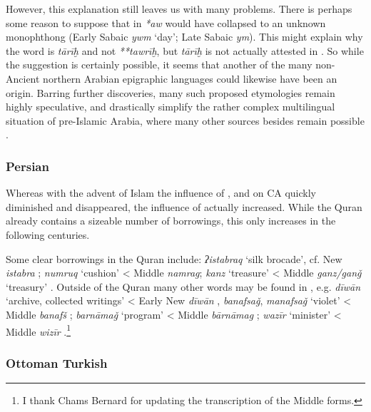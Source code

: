 \documentclass[output=paper]{langsci/langscibook}
\begin{document}
However, this explanation still leaves us with many problems. There is perhaps some reason to suppose that in  \textit{*aw} would have collapsed to an unknown {monophthong} (Early Sabaic \textit{ywm} ‘day’; {Late} Sabaic \textit{ym}). This might explain why the word is \textit{tārīḫ} and not \textit{**tawrīḫ}, but \textit{tārīḫ} is not actually attested in . So while the suggestion is certainly possible, it seems that another of the many non- Ancient northern Arabian epigraphic languages could likewise have been an origin. Barring further discoveries, many such proposed etymologies remain highly speculative, and drastically simplify the rather complex multilingual situation of pre-Islamic Arabia, where many other sources besides  remain possible \citep{Al-Jallad2018ANA}.

\subsubsection{\label{bkm:Ref13224492}Persian}

Whereas with the advent of Islam the influence of ,  and  on CA quickly diminished and disappeared, the influence of  actually increased. While the {Quran} already contains a sizeable number of  borrowings, this only increases in the following centuries.

Some clear  borrowings in the {Quran} include: \textit{ʔistabraq} `silk brocade', cf. New  \textit{istabra} \citep[204]{Eilers1962}; \textit{numruq} `cushion' < Middle  \textit{namrag}; \textit{kanz} ‘treasure’ < Middle  \textit{ganz/ganǧ} ‘treasury’ \citep[206]{Eilers1962}. Outside of the {Quran} many other  words may be found in , e.g. \textit{dīwān} ‘archive, collected writings’ < Early New  \textit{dīwān} \citep[223]{Eilers1962}, \textit{banafsaǧ}, \textit{manafsaǧ} ‘violet’ < Middle  \textit{banafš} \citep[596]{Eilers1971}; \textit{barnāmaǧ} ‘program’ < Middle  \textit{bārnāmag} \citep[217-218]{Eilers1962}; \textit{wazīr} ‘minister’ < Middle  \textit{wizīr} \citep[207]{Eilers1962}.\footnote{I thank Chams Bernard for updating the transcription of the Middle  forms.}

\subsubsection{\label{bkm:Ref13483797}Ottoman Turkish}
\end{document}
